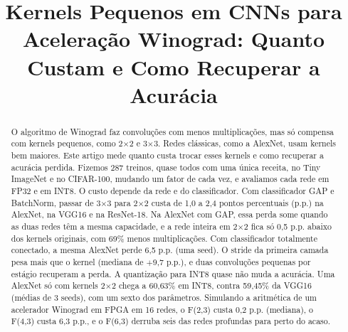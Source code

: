 \documentclass[conference]{IEEEtran}
\newcommand{\by}{\ensuremath{\times}}
\begin{document}
\title{Kernels Pequenos em CNNs para Aceleração Winograd: Quanto Custam e Como Recuperar a Acurácia}

\author{
\and
{}
}

\maketitle
\thispagestyle{plain}
\pagestyle{plain}

\begin{abstract}
O algoritmo de Winograd faz convoluções com menos multiplicações, mas só compensa com kernels pequenos, como 2\by2 e 3\by3.
Redes clássicas, como a AlexNet, usam kernels bem maiores. Este artigo mede quanto custa trocar esses kernels e como recuperar a
acurácia perdida. Fizemos 287 treinos, quase todos com uma única receita, no Tiny ImageNet e no CIFAR-100, mudando um fator de cada vez, e avaliamos
cada rede em FP32 e em INT8. O custo depende da rede e do classificador. Com classificador GAP e BatchNorm, passar de 3\by3 para 2\by2
custa de 1,0 a 2,4 pontos percentuais (p.p.) na AlexNet, na VGG16 e na ResNet-18. Na AlexNet com GAP, essa perda some quando as duas
redes têm a mesma capacidade, e a rede inteira em 2\by2 fica só 0,5 p.p. abaixo dos kernels originais, com 69\% menos multiplicações.
Com classificador totalmente conectado, a mesma AlexNet perde 6,5 p.p. (uma seed). O stride da primeira camada pesa mais que o kernel (mediana de
$+$9,7 p.p.), e duas convoluções pequenas por estágio recuperam a perda. A quantização para INT8 quase não muda a acurácia. Uma AlexNet
só com kernels 2\by2 chega a 60,63\% em INT8, contra 59,45\% da VGG16 (médias de 3 seeds), com um sexto dos parâmetros.
Simulando a aritmética de um acelerador Winograd em FPGA em 16 redes, o F(2,3) custa 0,2 p.p. (mediana), o F(4,3) custa 6,3 p.p.,
e o F(6,3) derruba seis das redes profundas para perto do acaso.
\end{abstract}
\end{document}
